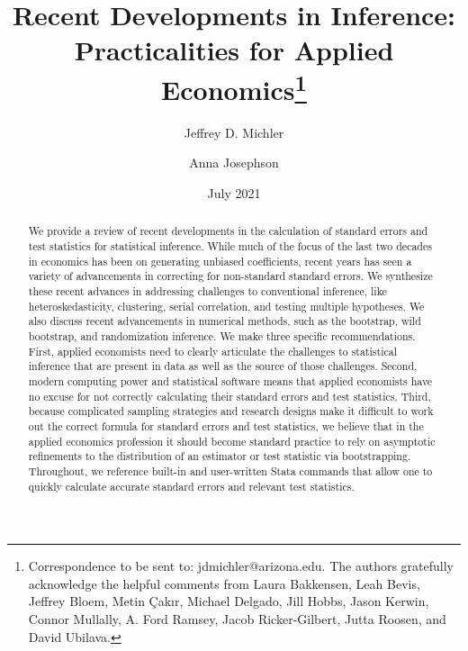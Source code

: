\documentclass[11pt]{article}
\begin{document}
	
\title{Recent Developments in Inference: Practicalities for Applied Economics\thanks{Correspondence to be sent to: jdmichler@arizona.edu. The authors gratefully acknowledge the helpful comments from Laura Bakkensen, Leah Bevis, Jeffrey Bloem, Metin \c{C}akır, Michael Delgado, Jill Hobbs, Jason Kerwin, Connor Mullally, A. Ford Ramsey, Jacob Ricker-Gilbert, Jutta Roosen, and David Ubilava.}}
	
	\author[a]{Jeffrey D. Michler}
	\author[a]{Anna Josephson}
	
	
\date{July 2021}
\maketitle
	
\begin{center}\begin{abstract}
	\noindent We provide a review of recent developments in the calculation of standard errors and test statistics for statistical inference. While much of the focus of the last two decades in economics has been on generating unbiased coefficients, recent years has seen a variety of advancements in correcting for non-standard standard errors. We synthesize these recent advances in addressing challenges to conventional inference, like heteroskedasticity, clustering, serial correlation, and testing multiple hypotheses. We also discuss recent advancements in numerical methods, such as the bootstrap, wild bootstrap, and randomization inference. We make three specific recommendations. First, applied economists need to clearly articulate the challenges to statistical inference that are present in data as well as the source of those challenges. Second, modern computing power and statistical software means that applied economists have no excuse for not correctly calculating their standard errors and test statistics. Third, because complicated sampling strategies and research designs make it difficult to work out the correct formula for standard errors and test statistics, we believe that in the applied economics profession it should become standard practice to rely on asymptotic refinements to the distribution of an estimator or test statistic via bootstrapping. Throughout, we reference built-in and user-written Stata commands that allow one to quickly calculate accurate standard errors and relevant test statistics.
\end{abstract}\end{center}
		
\end{document}
